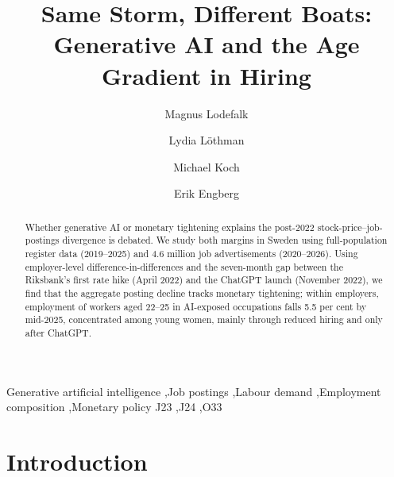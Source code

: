 \documentclass[preprint,12pt,authoryear]{elsarticle}
\begin{document}
\begin{frontmatter}

\title{Same Storm, Different Boats: Generative AI and the Age Gradient in Hiring}

\author[oru,ratio]{Magnus Lodefalk}
\author[oru]{Lydia L\"othman}
\author[au,kiel]{Michael Koch}
\author[oru,ratio]{Erik Engberg}

\address[oru]{\"Orebro University School of Business, SE-701 82 \"Orebro, Sweden}
\address[ratio]{RATIO Institute, Stockholm, Sweden}
\address[au]{Department of Economics and Business Economics, Aarhus University, Denmark}
\address[kiel]{Kiel Institut f\"ur Weltwirtschaft, Germany}

\begin{abstract}
Whether generative AI or monetary tightening explains the post-2022 stock-price--job-postings divergence is debated. We study both margins in Sweden using full-population register data (2019--2025) and 4.6 million job advertisements (2020--2026). Using employer-level difference-in-differences and the seven-month gap between the Riksbank's first rate hike (April 2022) and the ChatGPT launch (November 2022), we find that the aggregate posting decline tracks monetary tightening; within employers, employment of workers aged 22--25 in AI-exposed occupations falls 5.5 per cent by mid-2025, concentrated among young women, mainly through reduced hiring and only after ChatGPT.
\end{abstract}

\begin{keyword}
Generative artificial intelligence \sep Job postings \sep Labour demand \sep Employment composition \sep Monetary policy
\JEL J23 \sep J24 \sep O33
\end{keyword}

\end{frontmatter}

\section{Introduction}
\end{document}
